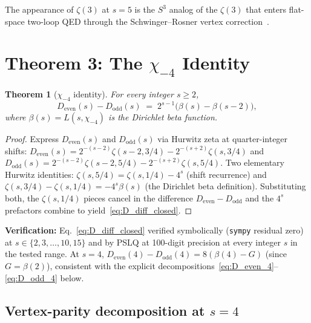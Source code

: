 \documentclass[11pt]{article}
\newtheorem{theorem}{Theorem}
\begin{document}
\noindent The appearance of $\zeta(3)$ at $s = 5$ is the $S^3$ analog of
the $\zeta(3)$ that enters flat-space two-loop QED through the
Schwinger--Rosner vertex correction~\cite{rosner1967}.

\section{Theorem 3: The $\chi_{-4}$ Identity}
\label{sec:chi4}

\begin{theorem}[$\chi_{-4}$ identity]
\label{thm:chi4}
For every integer $s \ge 2$,
\begin{equation}
  D_{\mathrm{even}}(s) - D_{\mathrm{odd}}(s)
    \;=\; 2^{s-1}\bigl(\beta(s) - \beta(s{-}2)\bigr),
  \label{eq:D_diff_closed}
\end{equation}
where $\beta(s) = L(s, \chi_{-4})$ is the Dirichlet beta function.
\end{theorem}

\begin{proof}
Express $D_{\mathrm{even}}(s)$ and $D_{\mathrm{odd}}(s)$ via Hurwitz
zeta at quarter-integer shifts:
$D_{\mathrm{even}}(s) = 2^{-(s-2)} \zeta(s{-}2, 3/4)
                       - 2^{-(s+2)} \zeta(s, 3/4)$
and
$D_{\mathrm{odd}}(s) = 2^{-(s-2)} \zeta(s{-}2, 5/4)
                       - 2^{-(s+2)} \zeta(s, 5/4)$.
Two elementary Hurwitz identities:
$\zeta(s, 5/4) = \zeta(s, 1/4) - 4^s$ (shift recurrence) and
$\zeta(s, 3/4) - \zeta(s, 1/4) = -4^s \beta(s)$ (the Dirichlet
beta definition).  Substituting both, the $\zeta(s, 1/4)$ pieces
cancel in the difference $D_{\mathrm{even}} - D_{\mathrm{odd}}$ and the
$4^s$ prefactors combine to yield~\eqref{eq:D_diff_closed}.
\end{proof}

\noindent\textbf{Verification:}
Eq.~\eqref{eq:D_diff_closed} verified symbolically (\texttt{sympy}
residual zero) at $s \in \{2, 3, \ldots, 10, 15\}$ and by PSLQ at
100-digit precision at every integer $s$ in the tested range.  At $s=4$,
$D_{\mathrm{even}}(4) - D_{\mathrm{odd}}(4) = 8(\beta(4) - G)$
(since $G = \beta(2)$), consistent with the explicit
decompositions~\eqref{eq:D_even_4}--\eqref{eq:D_odd_4} below.

\subsection{Vertex-parity decomposition at $s = 4$}
\end{document}
